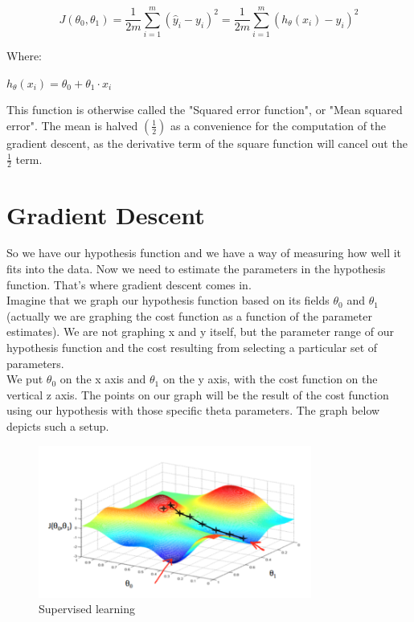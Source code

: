 \begin{equation}
J(\theta_0,\theta_1)=\frac{1}{2m}\sum_{i=1}^{m}(\hat{y}_i-y_i)^2 =\frac{1}{2m}\sum_{i=1}^{m}(h_\theta(x_i)-y_i)^2
\end{equation}


Where: 

\begin{center}
$h_\theta(x_i) = \theta_0 + \theta_1\cdot x_i$
\end{center}

This function is otherwise called the "Squared error function", or "Mean squared error". The mean is halved $\left(\frac{1}{2}\right)$  as a convenience for the computation of the gradient descent, as the derivative term of the square function will cancel out the $\frac{1}{2}$ term.\\

\section{Gradient Descent}

So we have our hypothesis function and we have a way of measuring how well it fits into the data. Now we need to estimate the parameters in the hypothesis function. That's where gradient descent comes in.\\

Imagine that we graph our hypothesis function based on its fields $  \theta_0 $ and $ \theta_1 $ (actually we are graphing the cost function as a function of the parameter estimates). We are not graphing x and y itself, but the parameter range of our hypothesis function and the cost resulting from selecting a particular set of parameters.\\

We put $ \theta_0 $ on the x axis and $ \theta_1 $  on the y axis, with the cost function on the vertical z axis. The points on our graph will be the result of the cost function using our hypothesis with those specific theta parameters. The graph below depicts such a setup.\\

\begin{figure}[h!]
	\centering
	\includegraphics[width=0.8\textwidth]{fig/gradient}
	\caption{Supervised learning}
\end{figure}

